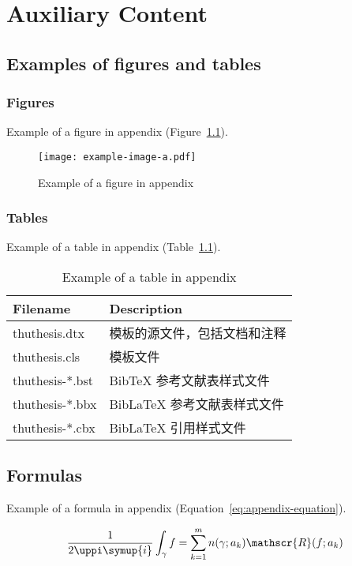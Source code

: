 
\chapter{Auxiliary Content}


\section{Examples of figures and tables}

\subsection{Figures}

Example of a figure in appendix (Figure~\ref{fig:appendix-figure}).

\begin{figure}
  \centering
  \texttt{[image: example-image-a.pdf]}
  \caption{Example of a figure in appendix}
  \label{fig:appendix-figure}
\end{figure}


\subsection{Tables}

Example of a table in appendix (Table~\ref{tab:appendix-table}).

\begin{table}
  \centering
  \caption{Example of a table in appendix}
  \begin{tabular}{ll}
    \toprule
    Filename          & Description                         \\
    \midrule
    thuthesis.dtx   & 模板的源文件，包括文档和注释 \\
    thuthesis.cls   & 模板文件                     \\
    thuthesis-*.bst & BibTeX 参考文献表样式文件    \\
    thuthesis-*.bbx & BibLaTeX 参考文献表样式文件  \\
    thuthesis-*.cbx & BibLaTeX 引用样式文件        \\
    \bottomrule
  \end{tabular}
  \label{tab:appendix-table}
\end{table}


\section{Formulas}

Example of a formula in appendix (Equation~\eqref{eq:appendix-equation}).

\begin{equation}
  \frac{1}{2 \uppi \symup{i}} \int_\gamma f = \sum_{k=1}^m n(\gamma; a_k) \mathscr{R}(f; a_k)
  \label{eq:appendix-equation}
\end{equation}
